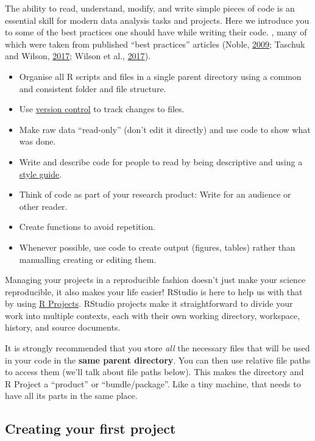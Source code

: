 \documentclass[]{Nemilov}
\providecommand{\tightlist}{%
  \setlength{\itemsep}{0pt}\setlength{\parskip}{0pt}}
\begin{document}
The ability to read, understand, modify, and write simple pieces of code is an
essential skill for modern data analysis tasks and projects. Here we introduce
you to some of the best practices one should have while writing their code.
, many of which were taken from published ``best practices'' articles
(Noble, \protect\hyperlink{ref-Nobl2009}{2009}; Taschuk and Wilson, \protect\hyperlink{ref-Tasc2017}{2017}; Wilson et al., \protect\hyperlink{ref-Wils2017}{2017}).

\begin{itemize}
\tightlist
\item
  Organise all R scripts and files in a single parent directory using a common
  and consistent folder and file structure.
\item
  Use \href{https://peerj.com/preprints/3159/}{version control} to track changes to files.
\item
  Make raw data ``read-only'' (don't edit it directly) and use code to show what
  was done.
\item
  Write and describe code for people to read by being descriptive and using a
  \href{https://style.tidyverse.org/}{style guide}.
\item
  Think of code as part of your research product: Write for an audience
  or other reader.
\item
  Create functions to avoid repetition.
\item
  Whenever possible, use code to create output (figures, tables) rather than
  manualling creating or editing them.
\end{itemize}

Managing your projects in a reproducible fashion doesn't just make your science
reproducible, it also makes your life easier! RStudio is here to help us with
that by using \href{https://support.rstudio.com/hc/en-us/articles/200526207-Using-Projects}{R Projects}. RStudio projects make it
straightforward to divide your work into multiple contexts, each with their own
working directory, workspace, history, and source documents.

It is strongly recommended that you store \emph{all} the necessary files that will be
used in your code in the \textbf{same parent directory}. You can then use
relative file paths to access them (we'll talk about file paths below). This
makes the directory and R Project a ``product'' or ``bundle/package''. Like a tiny
machine, that needs to have all its parts in the same place.

\hypertarget{creating-your-first-project}{%
\subsection{Creating your first project}\label{creating-your-first-project}}
\end{document}
